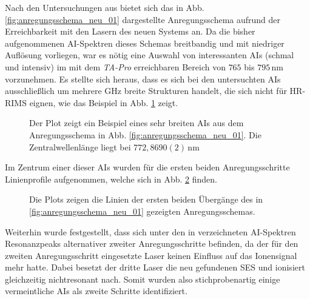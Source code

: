 Nach den Untersuchungen aus \cite{raeder:2011:dissertation} bietet sich das in
Abb. \ref{fig:anregungsschema_neu_01} dargestellte Anregungsschema aufrund der
Erreichbarkeit mit den Lasern des neuen Systems an. Da die bisher
aufgenommenen AI-Spektren dieses Schemas breitbandig und mit niedriger Auflösung vorliegen, war es nötig eine Auswahl von
interessanten AIs (schmal und intensiv) im mit dem \textit{TA-Pro} erreichbaren
Bereich von $765$ bis $795\,$nm vorzunehmen. Es stellte
sich heraus, dass es sich bei den untersuchten AIs ausschließlich um mehrere GHz
breite Strukturen handelt, die sich nicht für HR-RIMS eignen, wie das Beispiel
in Abb. \ref{fig:linienscans_neues_schema_01_AI_bsp} zeigt.
\begin{figure}[h]
 	\centering
 	\footnotesize
	
	\caption[AI Beispiel, neues Schema (1)]{Der Plot zeigt ein
	Beispiel eines sehr breiten AIs aus dem Anregungsschema in Abb.
	\ref{fig:anregungsschema_neu_01}. Die Zentralwellenlänge liegt bei
	$772,8690(2)\,$nm}
	\label{fig:linienscans_neues_schema_01_AI_bsp}
\end{figure}
Im Zentrum einer dieser AIs wurden für die ersten beiden Anregungsschritte
Linienprofile aufgenommen, welche sich in Abb. \ref{fig:linienscans_neues_schema_01} finden.
\begin{figure}[hp]
 	\centering
 	\footnotesize
	\caption[erster und zweiter Anregungsschritt, neues System, Schema (1)]{Die
	Plots zeigen die Linien der ersten beiden Übergänge des in
	\ref{fig:anregungsschema_neu_01} gezeigten Anregungsschemas.}
	\label{fig:linienscans_neues_schema_01}
\end{figure}
Weiterhin wurde festgestellt, dass sich unter den in
\cite{raeder:2011:dissertation} verzeichneten AI-Spektren Resonanzpeaks
alternativer zweiter Anregungsschritte befinden, da der für den
zweiten Anregungsschritt eingesetzte Laser keinen Einfluss auf das Ionensignal
mehr hatte.
Dabei besetzt der dritte Laser die neu gefundenen SES und
ionisiert gleichzeitig nichtresonant nach. Somit wurden also stichprobenartig
einige vermeintliche AIs als zweite Schritte identifiziert.\par
